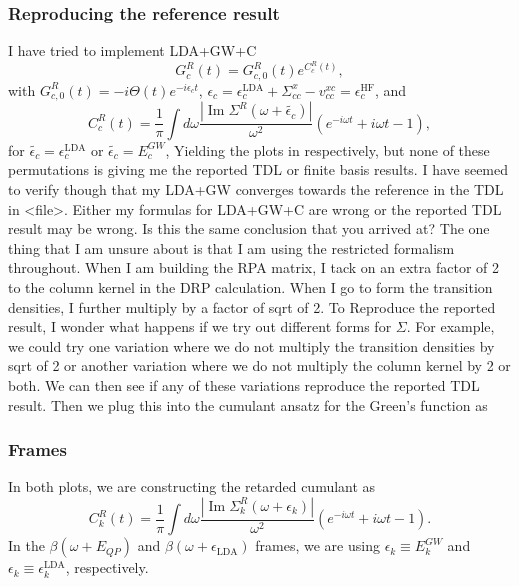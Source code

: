 \subsubsection{Reproducing the reference result}
I have tried to implement LDA+GW+C
\begin{equation}
    G^R_c(t) = G_{c,0}^R(t) e^{C_c^R(t)},
\end{equation}
with
$G_{c,0}^R(t) = -i \Theta(t) e^{-i\epsilon_c t}$, $\epsilon_c=\epsilon_c^{\mathrm{LDA}}+\Sigma_{cc}^{x}-v_{cc}^{xc}=\epsilon_c^{\mathrm{HF}}$, and
\begin{equation}
    C_c^R(t) = \frac{1}{\pi}\int d\omega \frac{|\operatorname{Im} \Sigma^R(\omega+\tilde{\epsilon_c})|}{\omega^2} \left( e^{-i\omega t} + i\omega t - 1 \right),
\end{equation}
for $\tilde{\epsilon_c} = \epsilon_c^{\mathrm{LDA}}$ or $\tilde{\epsilon_c} = E_c^{GW}$, Yielding the plots in respectively, but none of these permutations is giving me the reported TDL or finite basis results. I have seemed to verify though that my LDA+GW converges towards the reference in the TDL in <file>. Either my formulas for LDA+GW+C are wrong or the reported TDL result may be wrong. Is this the same conclusion that you arrived at? The one thing that I am unsure about is that I am using the restricted formalism throughout. When I am building the RPA matrix, I tack on an extra factor of 2 to the column kernel in the DRP calculation. When I go to form the transition densities, I further multiply by a factor of sqrt of 2. To Reproduce the reported result, I wonder what happens if we try out different forms for $\Sigma$. For example, we could try one variation where we do not multiply the transition densities by sqrt of 2 or another variation where we do not multiply the column kernel by 2 or both.
 We can then see if any of these variations reproduce the reported TDL result.
 Then we plug this into the cumulant ansatz for the Green's function as 

\subsubsection{Frames}
In both plots, we are constructing the retarded cumulant as 
\begin{equation}
    C_k^R(t) = \frac{1}{\pi}\int d\omega \frac{|\operatorname{Im} \Sigma^R_k(\omega+{\epsilon_k})|}{\omega^2} \left( e^{-i\omega t} + i\omega t - 1 \right).
\end{equation}
In the $\beta(\omega+E_{QP})$ and $\beta(\omega+\epsilon_{\mathrm{LDA}})$ frames, we are using $\epsilon_k \equiv E_k^{GW} $ and $\epsilon_k \equiv \epsilon_k^{\mathrm{LDA}}$, respectively.

